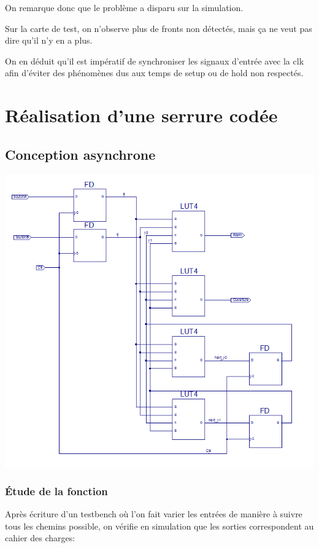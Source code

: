 \documentclass{article}
\begin{document}
On remarque donc que le problème a disparu sur la simulation.



Sur la carte de test, on n’observe plus de fronts non détectés, mais ça ne veut pas dire qu’il n’y en a plus.



On en déduit qu’il est impératif de synchroniser les signaux d’entrée avec la clk afin d’éviter des phénomènes dus aux temps de setup ou de hold non respectés.
\section{Réalisation d’une serrure codée}
\subsection{Conception asynchrone}

\includegraphics[width=\linewidth]{Serrure_Assynchrone.png}

\subsubsection{Étude de la fonction}

Après écriture d’un testbench où l’on fait varier les entrées de manière à suivre tous les chemins possible, on vérifie en simulation que les sorties correspondent au cahier des charges:
\end{document}
